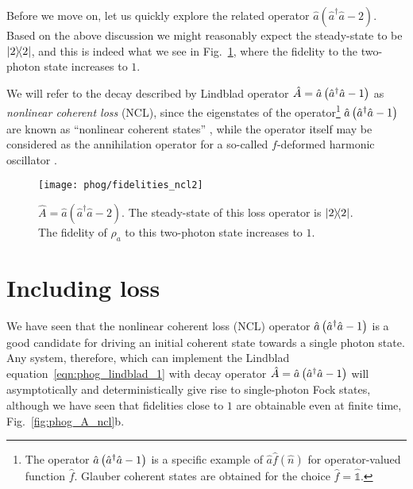 Before we move on, let us quickly explore the related operator $\hat{a}\left(\hat{a}^\dagger \hat{a} -2\right)$. Based on the above discussion we might reasonably expect the steady-state to be $\dyad{2}$, and this is indeed what we see in Fig.~\ref{fig:phog_A_ncl2}, where the fidelity to the two-photon state increases to $1$. 

We will refer to the decay described by Lindblad operator $\hat{A} = \hat{a}\left(\hat{a}^\dagger \hat{a} - 1\right)$ as \emph{nonlinear coherent loss} (NCL), since the eigenstates of the operator\footnote{The operator $\hat{a}\left(\hat{a}^\dagger \hat{a} - 1\right)$ is a specific example of $\hat{a} \hat{f}\left(\hat{n}\right)$ for operator-valued function $\hat{f}$. Glauber coherent states are obtained for the choice $\hat{f} = \hat{\mathds{1}}$.}
 $\hat{a}\left(\hat{a}^\dagger \hat{a} - 1\right)$ are known as ``nonlinear coherent states'' \cite{Manko1997}, while the operator itself may be considered as the annihilation operator for a so-called $f$-deformed harmonic oscillator \cite{Filho1996}.
\begin{figure}[htp]
\captionsetup{width=0.8\linewidth}
\centering
\texttt{[image: phog/fidelities\_ncl2]}
\caption{\label{fig:phog_A_ncl2} $\hat{A} = \hat{a}\left(\hat{a}^\dagger \hat{a} - 2\right)$. The steady-state of this loss operator is $\dyad{2}$. The fidelity of $\rho_a$ to this two-photon state increases to $1$.}
\end{figure}



\FloatBarrier
\section{Including loss}\label{sec:phog_including_loss}
We have seen that the nonlinear coherent loss (NCL) operator $\hat{a}\left(\hat{a}^\dagger \hat{a} - 1\right)$ is a good candidate for driving an initial coherent state towards a single photon state. Any system, therefore, which can implement the Lindblad equation~\ref{eqn:phog_lindblad_1} with decay operator $\hat{A} = \hat{a}\left(\hat{a}^\dagger \hat{a} - 1\right)$ will asymptotically and deterministically give rise to single-photon Fock states, although we have seen that fidelities close to $1$ are obtainable even at finite time, Fig.~\ref{fig:phog_A_ncl}b. 


